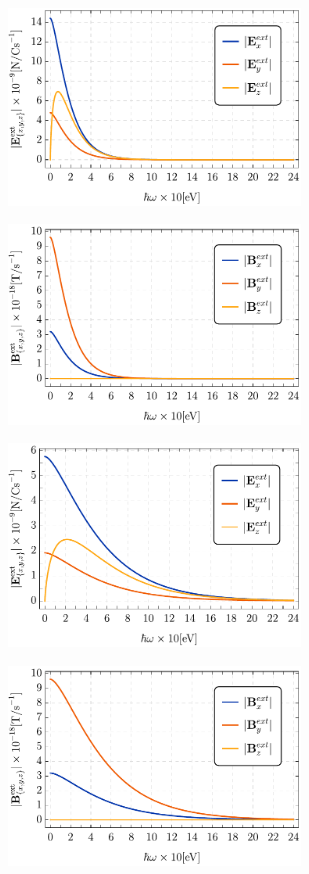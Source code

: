 \documentclass[a4paper,10pt]{article}
\begin{document}
\begin{figure}[htbp]
\begin{subfigure}[b]{0.5\textwidth}
\includegraphics[width=220pt]{EextGraph2.pdf}
\caption{}
\end{subfigure}
\begin{subfigure}[b]{0.5\textwidth}
\includegraphics[width=220pt]{BextGraph2.pdf}
\caption{}
\end{subfigure}
\begin{subfigure}[b]{0.5\textwidth}
\includegraphics[width=220pt]{EextGraph.pdf}
\caption{}
\end{subfigure}
\begin{subfigure}[b]{0.5\textwidth}
\includegraphics[width=220pt]{BextGraph.pdf}

\end{subfigure}
\end{figure}
\end{document}
